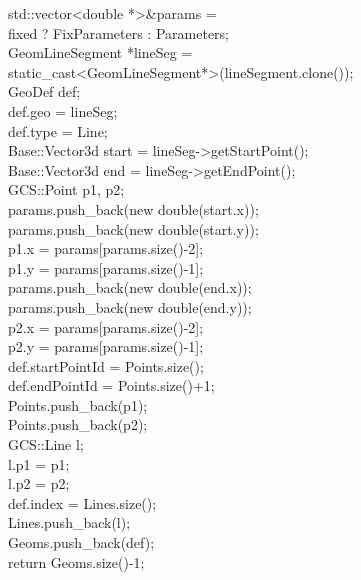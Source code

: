 \documentclass[12pt,twoside,a4paper]{book}
\begin{document}
    \begin{codequote}
    std::vector\textless{}double *\textgreater{}\&params = \\
    \-\hspace{0.75cm}fixed ? FixParameters : Parameters;\\

    GeomLineSegment *lineSeg = \\
    \-\hspace{0.75cm}static\_cast\textless{}GeomLineSegment*\textgreater{}(lineSegment.clone());\\

    GeoDef def;\\
    def.geo  = lineSeg;\\
    def.type = Line;\\

    Base::Vector3d start = lineSeg-\textgreater{}getStartPoint();\\
    Base::Vector3d end   = lineSeg-\textgreater{}getEndPoint();\\

    GCS::Point p1, p2;\\

    params.push\_back(new double(start.x));\\
    params.push\_back(new double(start.y));\\
    p1.x = params[params.size()-2];\\
    p1.y = params[params.size()-1];\\

    params.push\_back(new double(end.x));\\
    params.push\_back(new double(end.y));\\
    p2.x = params[params.size()-2];\\
    p2.y = params[params.size()-1];\\

    def.startPointId = Points.size();\\
    def.endPointId = Points.size()+1;\\
    Points.push\_back(p1);\\
    Points.push\_back(p2);\\

    GCS::Line l;\\
    l.p1 = p1;\\
    l.p2 = p2;\\
    def.index = Lines.size();\\
    Lines.push\_back(l);\\

    Geoms.push\_back(def);\\

    return Geoms.size()-1;
    \end{codequote}
\end{document}
